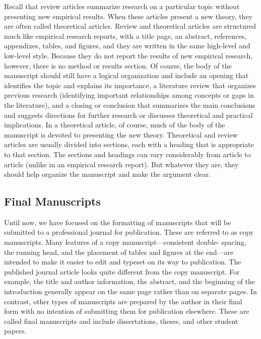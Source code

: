 Recall that review articles summarize research on a particular topic without presenting new empirical results. When these articles present a new theory, they are often called theoretical articles. Review and theoretical articles are structured much like empirical research reports, with a title page, an abstract, references, appendixes, tables, and figures, and they are written in the same high-level and low-level style. Because they do not report the results of new empirical research, however, there is no method or results section. Of course, the body of the manuscript should still have a logical organization and include an opening that identifies the topic and explains its importance, a literature review that organizes previous research (identifying important relationships among concepts or gaps in the literature), and a closing or conclusion that summarizes the main conclusions and suggests directions for further research or discusses theoretical and practical implications. In a theoretical article, of course, much of the body of the manuscript is devoted to presenting the new theory. Theoretical and review articles are usually divided into sections, each with a heading that is appropriate to that section. The sections and headings can vary considerably from article to article (unlike in an empirical research report). But whatever they are, they should help organize the manuscript and make the argument clear.

\subsection{Final Manuscripts}

Until now, we have focused on the formatting of manuscripts that will be submitted to a professional journal for publication. These are referred to as copy manuscripts. Many features of a copy manuscript---consistent double- spacing, the running head, and the placement of tables and figures at the end---are intended to make it easier to edit and typeset on its way to publication. The published journal article looks quite different from the copy manuscript. For example, the title and author information, the abstract, and the beginning of the introduction generally appear on the same page rather than on separate pages. In contrast, other types of manuscripts are prepared by the author in their final form with no intention of submitting them for publication elsewhere. These are called final manuscripts and include dissertations, theses, and other student papers.

